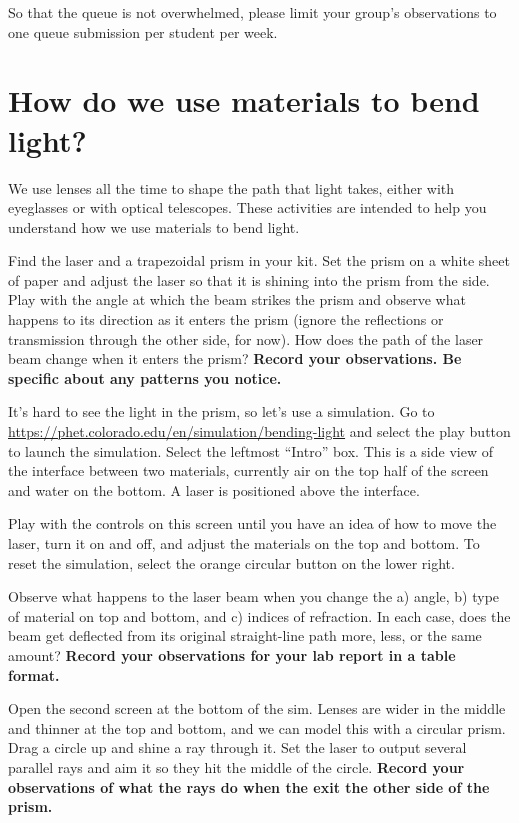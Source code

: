 So that the queue is not overwhelmed, please limit your group's observations to one queue submission per student per week.


\section{How do we use materials to bend light?}

We use lenses all the time to shape the path that light takes, either with eyeglasses or with optical telescopes. These activities are intended to help you understand how we use materials to bend light.

\begin{steps}
	\item Find the laser and a trapezoidal prism in your kit. Set the prism on a white sheet of paper and adjust the laser so that it is shining into the prism from the side. Play with the angle at which the beam strikes the prism and observe what happens to its direction as it enters the prism (ignore the reflections or transmission through the other side, for now). How does the path of the laser beam change when it enters the prism? \textbf{Record your observations. Be specific about any patterns you notice.}
	
	\item It's hard to see the light in the prism, so let's use a simulation. Go to \url{https://phet.colorado.edu/en/simulation/bending-light} and select the play button to launch the simulation. Select the leftmost ``Intro'' box. This is a side view of the interface between two materials, currently air on the top half of the screen and water on the bottom. A laser is positioned above the interface.
	
	\item Play with the controls on this screen until you have an idea of how to move the laser, turn it on and off, and adjust the materials on the top and bottom. To reset the simulation, select the orange circular button on the lower right.
	
	\item Observe what happens to the laser beam when you change the a) angle, b) type of material on top and bottom, and c) indices of refraction. In each case, does the beam get deflected from its original straight-line path more, less, or the same amount? \textbf{Record your observations for your lab report in a table format.}

	\item Open the second screen at the bottom of the sim. Lenses are wider in the middle and thinner at the top and bottom, and we can model this with a circular prism. Drag a circle up and shine a ray through it. Set the laser to output several parallel rays and aim it so they hit the middle of the circle. \textbf{Record your observations of what the rays do when the exit the other side of the prism.}
	

\end{steps}

